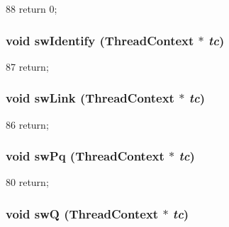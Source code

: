 \begin{DoxyCode}
88 { return 0; }
\end{DoxyCode}
\hypertarget{classCPA_a50a4bcd54d92400f9e5ddbf0acfdc7a0}{
\subsubsection[{swIdentify}]{\setlength{\rightskip}{0pt plus 5cm}void swIdentify ({\bf ThreadContext} $\ast$ {\em tc})}}
\label{classCPA_a50a4bcd54d92400f9e5ddbf0acfdc7a0}



\begin{DoxyCode}
87 { return; }
\end{DoxyCode}
\hypertarget{classCPA_ac7cc79e85798fb591b3969babfcf988c}{
\subsubsection[{swLink}]{\setlength{\rightskip}{0pt plus 5cm}void swLink ({\bf ThreadContext} $\ast$ {\em tc})}}
\label{classCPA_ac7cc79e85798fb591b3969babfcf988c}



\begin{DoxyCode}
86 { return; }
\end{DoxyCode}
\hypertarget{classCPA_a7f718c1ae3fd9d9e9b5e8b3eecc9d653}{
\subsubsection[{swPq}]{\setlength{\rightskip}{0pt plus 5cm}void swPq ({\bf ThreadContext} $\ast$ {\em tc})}}
\label{classCPA_a7f718c1ae3fd9d9e9b5e8b3eecc9d653}



\begin{DoxyCode}
80 { return; }
\end{DoxyCode}
\hypertarget{classCPA_afd13c108f3eb70425cedf08b2ec581bd}{
\subsubsection[{swQ}]{\setlength{\rightskip}{0pt plus 5cm}void swQ ({\bf ThreadContext} $\ast$ {\em tc})}}
\label{classCPA_afd13c108f3eb70425cedf08b2ec581bd}



